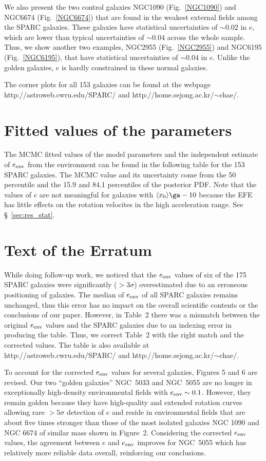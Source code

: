 \documentclass[twocolumn,tighten]{aastex63}
\begin{document}
We also present the two control galaxies NGC1090 (Fig.~\ref{NGC1090}) and NGC6674 (Fig.~\ref{NGC6674}) that are found in the weakest external fields among the SPARC galaxies. These galaxies have statistical uncertainties of $\sim 0.02$ in $e$, which are lower than typical uncertainties of $\sim 0.04$ across the whole sample. Thus, we show another two examples, NGC2955 (Fig.~\ref{NGC2955}) and NGC6195 (Fig.~\ref{NGC6195}), that have statistical uncertainties of $\sim 0.04$ in $e$. Unlike the golden galaxies, $e$ is hardly constrained in these normal galaxies.

The corner plots for all 153 galaxies can be found at the webpage \mbox{http://astroweb.cwru.edu/SPARC/} and \mbox{http://home.sejong.ac.kr/$\sim$chae/}.

\section{Fitted values of the parameters}

The MCMC fitted values of the model parameters and the independent estimate of $e_{\rm env}$ from the environment can be found in the following table for the 153 SPARC galaxies. The MCMC value and its uncertainty come from the 50 percentile and the 15.9 and 84.1 percentiles of the posterior PDF. Note that the values of $e$ are not meaningful for galaxies with $\langle x_0 \rangle \ga -10$ because the EFE has little effects on the rotation velocites in the high acceleration range. See \S~\ref{sec:res_stat}.

\section*{Text of the Erratum}

While doing follow-up work, we noticed that the $e_{\rm env}$ values of six of the 175 SPARC galaxies were significantly ($>3\sigma$) overestimated due to an erroneous positioning of galaxies. The median of $e_{\rm env}$ of all SPARC galaxies remains unchanged, thus this error has no impact on the overall scientific contents or the conclusions of our paper. However, in Table~2 there was a mismatch between the original $e_{\rm env}$ values and the SPARC galaxies due to an indexing error in producing the table. Thus, we correct Table~2 with the right match and the corrected values. The table is also available at \mbox{http://astroweb.cwru.edu/SPARC/} and \mbox{http://home.sejong.ac.kr/$\sim$chae/}.

To account for the corrected $e_{\rm env}$ values for several galaxies, Figures 5 and 6 are revised. Our two ``golden galaxies'' NGC~5033 and NGC~5055 are no longer in exceptionally high-density environmental fields with $e_{\rm env}\sim 0.1$. However, they remain golden because they have high-quality and extended rotation curves allowing rare $>5 \sigma$ detection of $e$ and reside in environmental fields that are about five times stronger than those of the most isolated galaxies NGC 1090 and NGC 6674 of similar mass shown in Figure~2. Considering the corrected $e_{\rm env}$ values, the agreement between $e$ and $e_{\rm env}$ improves for NGC~5055 which has relatively more reliable data overall, reinforcing our conclusions.
\end{document}
